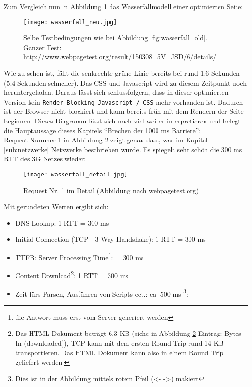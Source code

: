 	  Zum Vergleich nun in Abbildung \ref{fig:wasserfall_neu} das Wasserfallmodell einer optimierten Seite:

	  \begin{figure}[htbp]
	  	\begin{center}
	  		\texttt{[image: wasserfall\_neu.jpg]}
	  		\caption{Selbe Testbedingungen wie bei Abbildung \ref{fig:wasserfall_old}. Ganzer Test: \url{http://www.webpagetest.org/result/150308_5V_JSD/6/details/}}
	  		\label{fig:wasserfall_neu}
	  	\end{center}
	  \end{figure}
	  Wie zu sehen ist, fällt die senkrechte grüne Linie bereits bei rund 1.6 Sekunden (5.4 Sekunden schneller). Das CSS und Javascript wird zu diesem Zeitpunkt noch heruntergeladen. Daraus lässt sich schlussfolgern, dass in dieser optimierten Version kein \texttt{Render Blocking Javascript / CSS} mehr vorhanden ist. Dadurch ist der Browser nicht blockiert und kann bereits früh mit dem Rendern der Seite beginnen. Dieses Diagramm lässt sich noch viel weiter interpretieren und belegt die Hauptaussage dieses Kapitels "`Brechen der 1000 ms Barriere"':\\
	  Request Nummer 1 in Abbildung \ref{fig:wasserfall_detail} zeigt genau dass, was im Kapitel \ref{sub:netzwerke} Netzwerke beschrieben wurde. Es spiegelt sehr schön die 300 ms RTT des 3G Netzes wieder:
	  
	  \begin{figure}[htbp]
	  	\begin{center}
	  		\texttt{[image: wasserfall\_detail.jpg]}
	  		\caption{Request Nr. 1 im Detail (Abbildung nach webpagetest.org)}
	  		\label{fig:wasserfall_detail}
	  	\end{center}
	  \end{figure} 
	  
	  Mit gerundeten Werten ergibt sich:

	  \begin{itemize}
	  	\item DNS Lookup: 1 RTT = 300 ms
	  	\item Initial Connection (TCP - 3 Way Handshake): 1 RTT = 300 ms
	  	\item TTFB: Server Processing Time\footnote{die Antwort muss erst vom Server generiert werden}: = 300 ms
	  	\item Content Download\footnote{Das HTML Dokument beträgt 6.3 KB (siehe in Abbildung \ref{fig:wasserfall_detail} Eintrag: Bytes In (downloaded)), TCP kann mit dem ersten Round Trip rund 14 KB transportieren. Das HTML Dokument kann also in einem Round Trip geliefert werden.}: 1 RTT = 300 ms 
	  	\item Zeit fürs Parsen, Ausführen von Scripts ect.: ca. 500 ms \footnote{Dies ist in der Abbildung mittels rotem Pfeil (<- ->) makiert}:  
	  \end{itemize}
 
